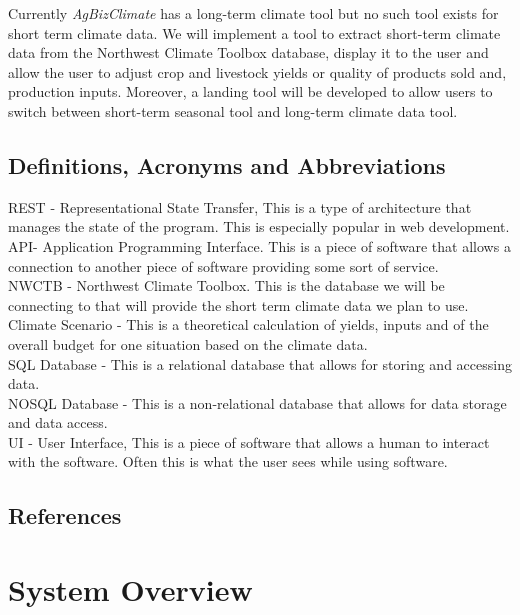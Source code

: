 \documentclass[onecolumn, draftclsnofoot,10pt, compsoc]{article}
\begin{document}
			Currently \textit{AgBizClimate} has a long-term climate tool but no such tool exists for short term climate data. We will implement a tool to extract short-term climate data from the Northwest Climate Toolbox database, display it to the user and allow the user to adjust crop and livestock yields or quality of products sold and, production inputs. Moreover, a landing tool will be developed to allow users to switch between short-term seasonal tool and long-term climate data tool.\\
		
		\subsection{Definitions, Acronyms and Abbreviations}
			REST - Representational State Transfer, This is a type of architecture that manages the state of the program. This is especially popular in web development.\\
			API- Application Programming Interface. This is a piece of software that allows a connection to another piece of software providing some sort of service.\\
			NWCTB - Northwest Climate Toolbox. This is the database we will be connecting to that will provide the short term climate data we plan to use.\\
			Climate Scenario - This is a theoretical calculation of yields, inputs and of the overall budget for one situation based on the climate data.\\
			SQL Database - This is a relational database that allows for storing and accessing data.\\
			NOSQL Database - This is a non-relational database that allows for data storage and data access.\\
			UI - User Interface, This is a piece of software that allows a human to interact with the software. Often this is what the user sees while using software.

			\renewcommand\refname{\vskip -1cm}
		\subsection{References}

		\nocite{*}
    
    
		
		
\section{System Overview}
\end{document}
